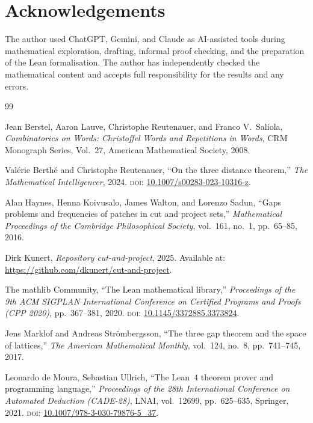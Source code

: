 \documentclass[11pt]{article}
\theoremstyle{plain}
\theoremstyle{definition}
\theoremstyle{remark}
\begin{document}
\section*{Acknowledgements}

The author used ChatGPT, Gemini, and Claude as AI-assisted tools during
mathematical exploration, drafting, informal proof checking, and the
preparation of the Lean formalisation.  The author has independently checked
the mathematical content and accepts full responsibility for the results and
any errors.

\begin{thebibliography}{99}

Jean Berstel, Aaron Lauve, Christophe Reutenauer, and Franco V.\ Saliola,
\emph{Combinatorics on Words: Christoffel Words and Repetitions in Words},
CRM Monograph Series, Vol.~27,
American Mathematical Society, 2008.

Val\'{e}rie Berth\'{e} and Christophe Reutenauer,
``On the three distance theorem,''
\emph{The Mathematical Intelligencer}, 2024.
\textsc{doi}: \href{https://doi.org/10.1007/s00283-023-10316-z}%
{10.1007/s00283-023-10316-z}.

Alan Haynes, Henna Koivusalo, James Walton, and Lorenzo Sadun,
``Gaps problems and frequencies of patches in cut and project sets,''
\emph{Mathematical Proceedings of the Cambridge Philosophical Society},
vol.~161, no.~1, pp.~65--85, 2016.

Dirk Kunert,
\emph{Repository cut-and-project}, 2025.
Available at: \url{https://github.com/dkunert/cut-and-project}.

The mathlib Community,
``The Lean mathematical library,''
\emph{Proceedings of the 9th ACM SIGPLAN International Conference on
Certified Programs and Proofs (CPP 2020)},
pp.~367--381, 2020.
\textsc{doi}: \href{https://doi.org/10.1145/3372885.3373824}%
{10.1145/3372885.3373824}.

Jens Marklof and Andreas Str\"{o}mbergsson,
``The three gap theorem and the space of lattices,''
\emph{The American Mathematical Monthly}, vol.~124, no.~8, pp.~741--745,
2017.

Leonardo de Moura, Sebastian Ullrich,
``The Lean~4 theorem prover and programming language,''
\emph{Proceedings of the 28th International Conference on Automated
Deduction (CADE-28)},
LNAI, vol.~12699, pp.~625--635, Springer, 2021.
\textsc{doi}: \href{https://doi.org/10.1007/978-3-030-79876-5_37}%
{10.1007/978-3-030-79876-5\_37}.


\end{thebibliography}
\end{document}
